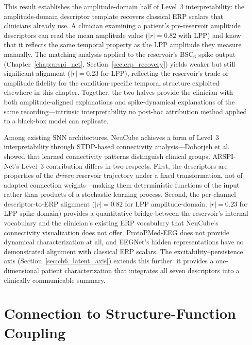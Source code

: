 This result establishes the amplitude-domain half of Level~3 interpretability: the amplitude-domain descriptor template recovers classical ERP scalars that clinicians already use. A clinician examining a patient's pre-reservoir amplitude descriptors can read the mean amplitude value ($|r| = 0.82$ with LPP) and know that it reflects the same temporal property as the LPP amplitude they measure manually. The matching analysis applied to the reservoir's BSC$_6$ spike output (Chapter~\ref{chap:arspi_net}, Section~\ref{sec:erp_recovery}) yields weaker but still significant alignment ($|r| = 0.23$ for LPP), reflecting the reservoir's trade of amplitude fidelity for the condition-specific temporal structure exploited elsewhere in this chapter. Together, the two halves provide the clinician with both amplitude-aligned explanations and spike-dynamical explanations of the same recording---intrinsic interpretability no post-hoc attribution method applied to a black-box model can replicate.

Among existing SNN architectures, NeuCube \cite{kasabov_neucube_2014} achieves a form of Level~3 interpretability through STDP-based connectivity analysis---Doborjeh et al.\ \cite{doborjeh_explainable_2021} showed that learned connectivity patterns distinguish clinical groups. ARSPI-Net's Level~3 contribution differs in two respects. First, the descriptors are properties of the \emph{driven} reservoir trajectory under a fixed transformation, not of adapted connection weights---making them deterministic functions of the input rather than products of a stochastic learning process. Second, the per-channel descriptor-to-ERP alignment ($|r| = 0.82$ for LPP amplitude-domain, $|r| = 0.23$ for LPP spike-domain) provides a quantitative bridge between the reservoir's internal vocabulary and the clinician's existing ERP vocabulary that NeuCube's connectivity visualization does not offer. ProtoPMed-EEG \cite{barnett_protopmed_2024} does not provide dynamical characterization at all, and EEGNet's hidden representations have no demonstrated alignment with classical ERP scalars. The excitability--persistence axis (Section~\ref{sec:ch6_latent_axis}) extends this further: it provides a one-dimensional patient characterization that integrates all seven descriptors into a clinically communicable summary.


\section{Connection to Structure-Function Coupling}
\label{sec:ch6_bridge}

